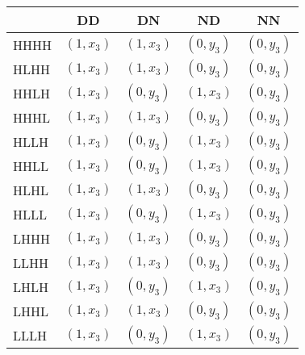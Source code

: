 \begin{tabular}{lrrrr}
\toprule
      & \multicolumn{1}{c}{DD} & \multicolumn{1}{c}{DN} & \multicolumn{1}{c}{ND} & \multicolumn{1}{c}{NN} \\
\midrule
HHHH  & \multicolumn{1}{l}{$( 1 , x_3 )$} & \multicolumn{1}{l}{$( 1 , x_3 )$} & \multicolumn{1}{l}{$( 0 , y_3 )$} & \multicolumn{1}{l}{$( 0 , y_3 )$} \\
HLHH  & \multicolumn{1}{l}{$( 1 , x_3 )$} & \multicolumn{1}{l}{$( 1 , x_3 )$} & \multicolumn{1}{l}{$( 0 , y_3 )$} & \multicolumn{1}{l}{$( 0 , y_3 )$} \\
HHLH  & \multicolumn{1}{l}{$( 1 , x_3 )$} & \multicolumn{1}{l}{$( 0 , y_3 )$} & \multicolumn{1}{l}{$( 1 , x_3 )$} & \multicolumn{1}{l}{$( 0 , y_3 )$} \\
HHHL  & \multicolumn{1}{l}{$( 1 , x_3 )$} & \multicolumn{1}{l}{$( 1 , x_3 )$} & \multicolumn{1}{l}{$( 0 , y_3 )$} & \multicolumn{1}{l}{$( 0 , y_3 )$} \\
HLLH  & \multicolumn{1}{l}{$( 1 , x_3 )$} & \multicolumn{1}{l}{$( 0 , y_3 )$} & \multicolumn{1}{l}{$( 1 , x_3 )$} & \multicolumn{1}{l}{$( 0 , y_3 )$} \\
HHLL  & \multicolumn{1}{l}{$( 1 , x_3 )$} & \multicolumn{1}{l}{$( 0 , y_3 )$} & \multicolumn{1}{l}{$( 1 , x_3 )$} & \multicolumn{1}{l}{$( 0 , y_3 )$} \\
HLHL  & \multicolumn{1}{l}{$( 1 , x_3 )$} & \multicolumn{1}{l}{$( 1 , x_3 )$} & \multicolumn{1}{l}{$( 0 , y_3 )$} & \multicolumn{1}{l}{$( 0 , y_3 )$} \\
HLLL  & \multicolumn{1}{l}{$( 1 , x_3 )$} & \multicolumn{1}{l}{$( 0 , y_3 )$} & \multicolumn{1}{l}{$( 1 , x_3 )$} & \multicolumn{1}{l}{$( 0 , y_3 )$} \\
LHHH  & \multicolumn{1}{l}{$( 1 , x_3 )$} & \multicolumn{1}{l}{$( 1 , x_3 )$} & \multicolumn{1}{l}{$( 0 , y_3 )$} & \multicolumn{1}{l}{$( 0 , y_3 )$} \\
LLHH  & \multicolumn{1}{l}{$( 1 , x_3 )$} & \multicolumn{1}{l}{$( 1 , x_3 )$} & \multicolumn{1}{l}{$( 0 , y_3 )$} & \multicolumn{1}{l}{$( 0 , y_3 )$} \\
LHLH  & \multicolumn{1}{l}{$( 1 , x_3 )$} & \multicolumn{1}{l}{$( 0 , y_3 )$} & \multicolumn{1}{l}{$( 1 , x_3 )$} & \multicolumn{1}{l}{$( 0 , y_3 )$} \\
LHHL  & \multicolumn{1}{l}{$( 1 , x_3 )$} & \multicolumn{1}{l}{$( 1 , x_3 )$} & \multicolumn{1}{l}{$( 0 , y_3 )$} & \multicolumn{1}{l}{$( 0 , y_3 )$} \\
LLLH  & \multicolumn{1}{l}{$( 1 , x_3 )$} & \multicolumn{1}{l}{$( 0 , y_3 )$} & \multicolumn{1}{l}{$( 1 , x_3 )$} & \multicolumn{1}{l}{$( 0 , y_3 )$} \\

\end{tabular}
